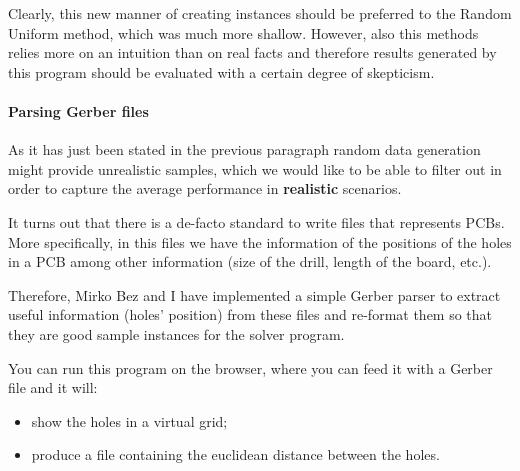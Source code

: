 Clearly, this new manner of creating instances should be preferred to the
Random Uniform method, which was much more shallow. However, also this methods
relies more on an intuition than on real facts and therefore results generated
by this program should be evaluated with a certain degree of skepticism.

\paragraph{Parsing Gerber files} As it has just been stated in the previous
paragraph random data generation might provide unrealistic samples, which
we would like to be able to filter out in order to capture the average
performance in \textbf{realistic} scenarios.

It turns out that there is a de-facto standard to write files that represents
PCBs. More specifically, in this files we have the information of the positions
of the holes in a PCB among other information (size of the drill, length of the
board, etc.).

Therefore, Mirko Bez and I have implemented a simple Gerber parser to extract
useful information (holes' position) from these files and re-format them so
that they are good sample instances for the solver program.

You can run this program on the browser, where you can feed it with a Gerber
file and it will:
\begin{itemize}
	\item show the holes in a virtual grid;
	\item produce a file containing the euclidean distance between the holes.
\end{itemize}
